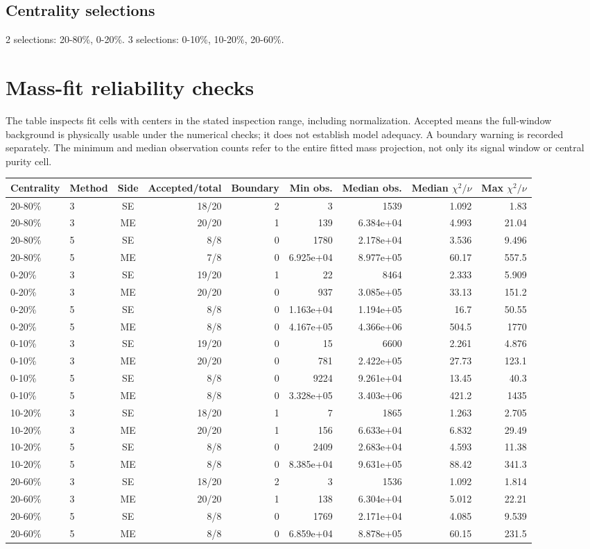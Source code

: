 \documentclass[10pt,a4paper]{article}
\begin{document}
\subsection*{Centrality selections}
2 selections: 20-80\%, 0-20\%.
3 selections: 0-10\%, 10-20\%, 20-60\%.
\clearpage\section{Mass-fit reliability checks}
The table inspects fit cells with centers in the stated inspection range, including normalization. Accepted means the full-window background is physically usable under the numerical checks; it does not establish model adequacy. A boundary warning is recorded separately. The minimum and median observation counts refer to the entire fitted mass projection, not only its signal window or central purity cell.
{\scriptsize\setlength{\tabcolsep}{3pt}\begin{longtable}{llcrrrrrr}\toprule Centrality & Method & Side & Accepted/total & Boundary & Min obs. & Median obs. & Median $\chi^2/\nu$ & Max $\chi^2/\nu$\\\midrule\endhead
20-80\% & 3 & SE & 18/20 & 2 & 3 & 1539 & 1.092 & 1.83\\
20-80\% & 3 & ME & 20/20 & 1 & 139 & 6.384e+04 & 4.993 & 21.04\\
20-80\% & 5 & SE & 8/8 & 0 & 1780 & 2.178e+04 & 3.536 & 9.496\\
20-80\% & 5 & ME & 7/8 & 0 & 6.925e+04 & 8.977e+05 & 60.17 & 557.5\\
0-20\% & 3 & SE & 19/20 & 1 & 22 & 8464 & 2.333 & 5.909\\
0-20\% & 3 & ME & 20/20 & 0 & 937 & 3.085e+05 & 33.13 & 151.2\\
0-20\% & 5 & SE & 8/8 & 0 & 1.163e+04 & 1.194e+05 & 16.7 & 50.55\\
0-20\% & 5 & ME & 8/8 & 0 & 4.167e+05 & 4.366e+06 & 504.5 & 1770\\
0-10\% & 3 & SE & 19/20 & 0 & 15 & 6600 & 2.261 & 4.876\\
0-10\% & 3 & ME & 20/20 & 0 & 781 & 2.422e+05 & 27.73 & 123.1\\
0-10\% & 5 & SE & 8/8 & 0 & 9224 & 9.261e+04 & 13.45 & 40.3\\
0-10\% & 5 & ME & 8/8 & 0 & 3.328e+05 & 3.403e+06 & 421.2 & 1435\\
10-20\% & 3 & SE & 18/20 & 1 & 7 & 1865 & 1.263 & 2.705\\
10-20\% & 3 & ME & 20/20 & 1 & 156 & 6.633e+04 & 6.832 & 29.49\\
10-20\% & 5 & SE & 8/8 & 0 & 2409 & 2.683e+04 & 4.593 & 11.38\\
10-20\% & 5 & ME & 8/8 & 0 & 8.385e+04 & 9.631e+05 & 88.42 & 341.3\\
20-60\% & 3 & SE & 18/20 & 2 & 3 & 1536 & 1.092 & 1.814\\
20-60\% & 3 & ME & 20/20 & 1 & 138 & 6.304e+04 & 5.012 & 22.21\\
20-60\% & 5 & SE & 8/8 & 0 & 1769 & 2.171e+04 & 4.085 & 9.539\\
20-60\% & 5 & ME & 8/8 & 0 & 6.859e+04 & 8.878e+05 & 60.15 & 231.5\\
\bottomrule\end{longtable}}
\end{document}
